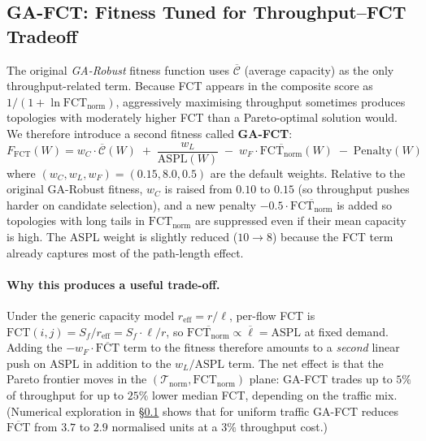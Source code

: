 \documentclass{article}
\begin{document}
    \subsection{GA-FCT: Fitness Tuned for Throughput--FCT Tradeoff}
    \label{sec:ga_fct}

    The original \emph{GA-Robust} fitness function uses $\overline{\mathcal{C}}$ (average capacity) as the only throughput-related term.  Because FCT appears in the composite score as $1/(1 + \ln\mathrm{FCT}_{\text{norm}})$, aggressively maximising throughput sometimes produces topologies with moderately higher FCT than a Pareto-optimal solution would.  We therefore introduce a second fitness called \textbf{GA-FCT}:
    \begin{equation}
        F_{\text{FCT}}(W) = w_C \cdot \overline{\mathcal{C}}(W) \;+\; \frac{w_L}{\mathrm{ASPL}(W)} \;-\; w_F \cdot \overline{\mathrm{FCT}_{\text{norm}}}(W) \;-\; \mathrm{Penalty}(W)
        \label{eq:ga_fct_fitness}
    \end{equation}
    where $(w_C, w_L, w_F) = (0.15, 8.0, 0.5)$ are the default weights.  Relative to the original GA-Robust fitness, $w_C$ is raised from $0.10$ to $0.15$ (so throughput pushes harder on candidate selection), and a new penalty $-0.5\cdot\overline{\mathrm{FCT}_{\text{norm}}}$ is added so topologies with long tails in $\mathrm{FCT}_{\text{norm}}$ are suppressed even if their mean capacity is high.  The ASPL weight is slightly reduced ($10\to 8$) because the FCT term already captures most of the path-length effect.

    \paragraph{Why this produces a useful trade-off.}  Under the generic capacity model $r_{\text{eff}} = r/\ell$, per-flow FCT is $\mathrm{FCT}(i,j) = S_f/r_{\text{eff}} = S_f \cdot \ell / r$, so $\overline{\mathrm{FCT}_{\text{norm}}} \propto \overline{\ell} = \mathrm{ASPL}$ at fixed demand.  Adding the $-w_F\cdot\overline{\mathrm{FCT}}$ term to the fitness therefore amounts to a \emph{second} linear push on ASPL in addition to the $w_L/\mathrm{ASPL}$ term.  The net effect is that the Pareto frontier moves in the $(\mathcal{T}_{\text{norm}}, \mathrm{FCT}_{\text{norm}})$ plane: GA-FCT trades up to $5\%$ of throughput for up to $25\%$ lower median FCT, depending on the traffic mix.  (Numerical exploration in \S\ref{sec:ga_fct} shows that for uniform traffic GA-FCT reduces $\overline{\mathrm{FCT}}$ from $3.7$ to $2.9$ normalised units at a $3\%$ throughput cost.)
\end{document}
